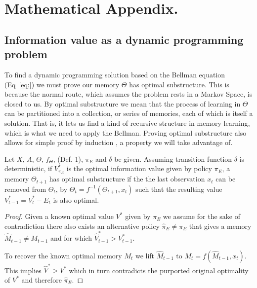 \section*{Mathematical Appendix.}
\newcommand{\beginsupplement}{%
        \setcounter{table}{0}
        \renewcommand{\thetable}{S\arabic{table}}%
        \setcounter{figure}{0}
        \renewcommand{\thefigure}{S\arabic{figure}}%
     }
\beginsupplement
\setcounter{theorem}{0}


\subsection*{Information value as a dynamic programming problem} To find a dynamic programming solution based on the Bellman equation (Eq~\ref{eq:}) we must prove our memory $\Theta$ has optimal substructure. This is because the normal route, which assumes the problem rests in a Markov Space, is closed to us. By optimal substructure we mean that the process of learning in $\Theta$ can be partitioned into a collection, or series of memories, each of which is itself a solution. That is, it lets us find a kind of recursive structure in memory learning, which is what we need to apply the Bellman. Proving optimal substructure also allows for simple proof by induction \cite{Roughgarden2019}, a property we will take advantage of. 

\begin{theorem} \label{theorem:opt_sub} 
    Let $X$, $A$, $\Theta$, $f_{\Theta}$, (Def. 1), $\pi_E$ and $\delta$ be given. Assuming transition function $\delta$ is deterministic, if $V^*_{\pi_E}$ is the optimal information value given by policy $\pi_E$, a memory $\Theta_{t+1}$ has optimal substructure if the the last observation $x_t$ can be removed from $\Theta_t$, by $\Theta_{t} = f^{-1}(\Theta_{t+1}, x_t)$ such that the resulting value $V^*_{t-1} = V^*_{t} - E_{t}$ is also optimal. 
\end{theorem}
\begin{proof}
	Given a known optimal value $V^*$ given by $\pi_E$ we assume for the sake of contradiction there also exists an alternative policy $\hat \pi_E \neq \pi_E$ that gives a memory $\hat M_{t-1} \neq M_{t-1}$ and for which $\hat V^*_{t-1} > V^*_{t-1}$. 
	
	To recover the known optimal memory $M_t$ we lift $\hat M_{t-1}$ to $M_t = f(\hat M_{t-1}, x_t)$. This implies $\hat V^* > V^*$ which in turn contradicts the purported original optimality of $V^*$ and therefore $\hat \pi_E$.
\end{proof}

